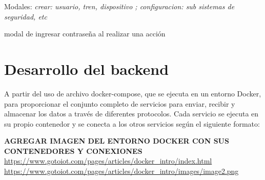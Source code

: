 Modales: \textit{crear: usuario, tren, dispositivo ; configuracion: sub sistemas de seguridad, etc}

modal de ingresar contraseña al realizar una acción


\newpage
\section{Desarrollo del backend}


A partir del uso de archivo docker-compose, que se ejecuta en un entorno Docker, para proporcionar el conjunto completo de servicios para enviar, recibir y almacenar los datos a través de diferentes protocolos. Cada servicio se ejecuta en su propio contenedor y se conecta a los otros servicios según el siguiente formato:


\textbf{AGREGAR IMAGEN DEL ENTORNO DOCKER CON SUS CONTENEDORES Y CONEXIONES }
\url{https://www.gotoiot.com/pages/articles/docker_intro/index.html}
\url{https://www.gotoiot.com/pages/articles/docker_intro/images/image2.png}



